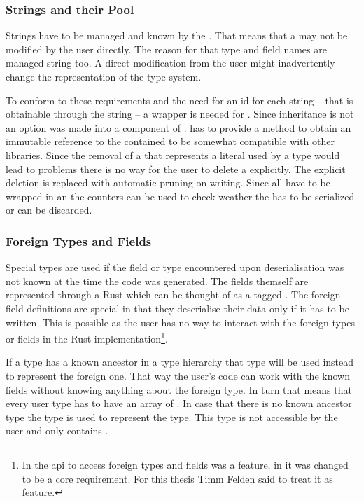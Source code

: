 \documentclass[thesis]{subfiles}
\begin{document}
    \subsubsection{Strings and their Pool}
      Strings have to be managed and known by the \StringPool.
      That means that a \String may not be modified by the user directly.
      The reason for that type and field names are managed string too.
      A direct modification from the user might inadvertently change the representation of the type system.

      To conform to these requirements and the need for an id for each string -- that is obtainable through the string -- a wrapper is needed for \String.
      Since inheritance is not an option was \String made into a component of \SkillString.
      \SkillString has to provide a method to obtain an immutable reference to the contained \String to be somewhat compatible with other libraries.
      Since the removal of a \SkillString that represents a literal used by a type would lead to problems there is no way for the user to delete a \SkillString explicitly.
      The explicit deletion is replaced with automatic pruning on writing.
      Since all \SkillString have to be wrapped in an \RcT the counters can be used to check weather the \SkillString has to be serialized or can be discarded.

    \subsubsection{Foreign Types and Fields}
      Special types are used if the field or type encountered upon deserialisation was not known at the time the code was generated.
      The fields themself are represented through a Rust \enum which can be thought of as a tagged .
      The foreign field definitions are special in that they deserialise their data only if it has to be written.
      This is possible as the user has no way to interact with the foreign types or fields in the Rust implementation\footnote{%
        In \autocite{skill-tr13} the \gls{api} to access foreign types and fields was a feature, in \autocite{skill-tr} it was changed to be a core requirement. For this thesis Timm Felden said to treat it as feature.
      }.

      If a type has a known ancestor in a type hierarchy that type will be used instead to represent the foreign one.
      That way the user's code can work with the known fields without knowing anything about the foreign type.
      In turn that means that every user type has to have an array of \ForeignFieldData.
      In case that there is no known ancestor type the \Foreign type is used to represent the type.
      This type is not accessible by the user and only contains \ForeignFieldData.
\end{document}
